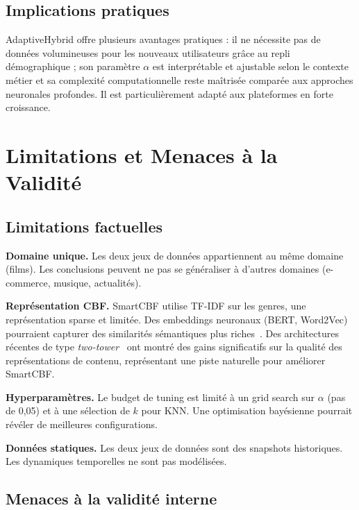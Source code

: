 \documentclass[conference]{IEEEtran}
\begin{document}
\subsection{Implications pratiques}

AdaptiveHybrid offre plusieurs avantages pratiques : il ne nécessite pas
de données volumineuses pour les nouveaux utilisateurs grâce au repli
démographique ; son paramètre $\alpha$ est interprétable et ajustable
selon le contexte métier et sa complexité computationnelle reste maîtrisée
comparée aux approches neuronales profondes. Il est particulièrement adapté
aux plateformes en forte croissance.



\section{Limitations et Menaces à la Validité}
\label{sec:limitations}

\subsection{Limitations factuelles}

\textbf{Domaine unique.} Les deux jeux de données appartiennent au même domaine
(films). Les conclusions peuvent ne pas se généraliser à d'autres domaines
(e-commerce, musique, actualités).

\textbf{Représentation CBF.} SmartCBF utilise TF-IDF sur les genres, une
représentation sparse et limitée. Des embeddings neuronaux (BERT, Word2Vec)
pourraient capturer des similarités sémantiques plus riches~\cite{zhang2019}.
Des architectures récentes de type \textit{two-tower}~\cite{yu2023} ont montré
des gains significatifs sur la qualité des représentations de contenu,
représentant une piste naturelle pour améliorer SmartCBF.

\textbf{Hyperparamètres.} Le budget de tuning est limité à un grid search sur
$\alpha$ (pas de 0,05) et à une sélection de $k$ pour KNN. Une optimisation
bayésienne pourrait révéler de meilleures configurations.

\textbf{Données statiques.} Les deux jeux de données sont des snapshots
historiques. Les dynamiques temporelles ne sont pas modélisées.

\subsection{Menaces à la validité interne}
\end{document}

